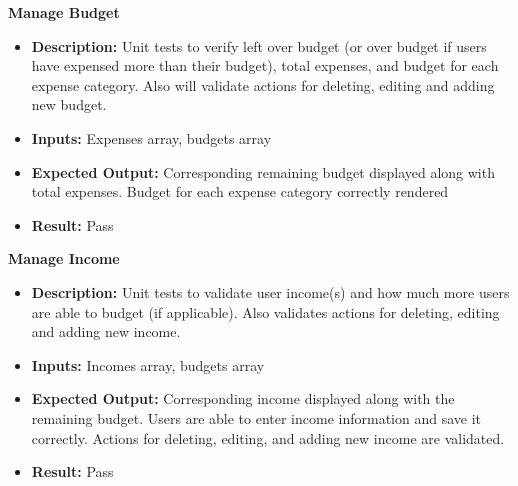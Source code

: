 \documentclass[12pt, titlepage]{article}
\begin{document}
\textbf{Manage Budget}

\begin{itemize}
  \item \textbf{Description:} Unit tests to verify left over budget (or over budget if users have expensed more than their budget), total expenses, and budget for each expense category.
  Also will validate actions for deleting, editing and adding new budget.
  \item \textbf{Inputs:} Expenses array, budgets array
  \item \textbf{Expected Output:} Corresponding remaining budget displayed along with total expenses. Budget for each expense category correctly rendered
  \item \textbf{Result:} Pass
\end{itemize}

\textbf{Manage Income}

\begin{itemize}
  \item \textbf{Description:} Unit tests to validate user income(s) and how much more users are able to budget (if applicable). Also validates actions for deleting, editing and adding
  new income.
  \item \textbf{Inputs:} Incomes array, budgets array
  \item \textbf{Expected Output:} Corresponding income displayed along with the remaining budget. Users are able to enter income information and save it correctly. 
  Actions for deleting, editing, and adding new income are validated.
  \item \textbf{Result:} Pass
\end{itemize}


\end{document}
